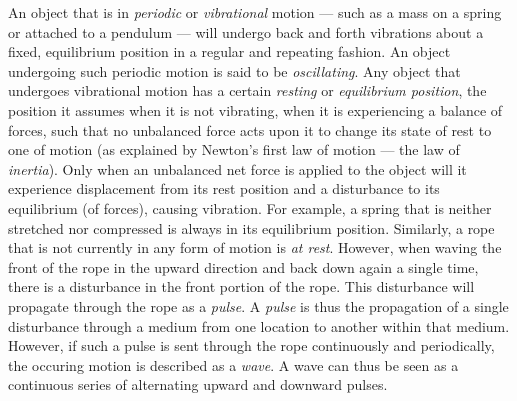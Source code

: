 



\thispagestyle{plain}



An object that is in \emph{periodic} or \emph{vibrational} motion --- such as a mass on a spring or attached to a pendulum --- will undergo back and forth vibrations about a fixed, equilibrium position in a regular and repeating fashion. An object undergoing such periodic motion is said to be \emph{oscillating}. Any object that undergoes vibrational motion has a certain \emph{resting} or \emph{equilibrium position}, the position it assumes when it is not vibrating, when it is experiencing a balance of forces, such that no unbalanced force acts upon it to change its state of rest to one of motion (as explained by Newton's first law of motion --- the law of \emph{inertia}). Only when an unbalanced net force is applied to the object will it experience displacement from its rest position and a disturbance to its equilibrium (of forces), causing vibration. For example, a spring that is neither stretched nor compressed is always in its equilibrium position. Similarly, a rope that is not currently in any form of motion is \emph{at rest}. However, when waving the front of the rope in the upward direction and back down again a single time, there is a disturbance in the front portion of the rope. This disturbance will propagate through the rope as a \emph{pulse}. A \emph{pulse} is thus the propagation of a single disturbance through a medium from one location to another within that medium. However, if such a pulse is sent through the rope continuously and periodically, the occuring motion is described as a \emph{wave}. A wave can thus be seen as a continuous series of alternating upward and downward pulses.


